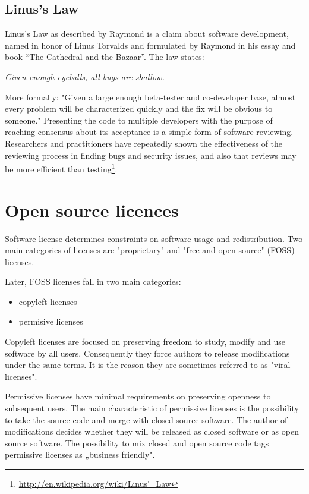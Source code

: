 \documentclass[times, utf8, seminar]{fit}
\begin{document}
\subsection{Linus's Law}

Linus's Law as described by Raymond is a claim about software development, named in honor of Linus Torvalds and formulated by Raymond in his essay and book ``The Cathedral and the Bazaar''\citep{bazaar}. The law states:

\begin{center}
\emph{\large{Given enough eyeballs, all bugs are shallow.}}
\end{center}

More formally: "Given a large enough beta-tester and co-developer base, almost every problem will be characterized quickly and the fix will be obvious to someone." Presenting the code to multiple developers with the purpose of reaching consensus about its acceptance is a simple form of software reviewing. Researchers and practitioners have repeatedly shown the effectiveness of the reviewing process in finding bugs and security issues, and also that reviews may be more efficient than testing\footnote{\url{http://en.wikipedia.org/wiki/Linus'\_Law}}.

\section{Open source licences}

Software license determines constraints on software usage and redistribution. Two main categories of licenses are "proprietary" and "free and open source" (FOSS) licenses.

Later, FOSS licenses fall in two main categories:
\begin{itemize}
  \item copyleft licenses
  \item permisive licenses 
\end{itemize} 

Copyleft licenses are focused on preserving freedom to study, modify and use software by all users. Consequently they force authors to release modifications under the same terms. It is the reason they are sometimes referred to as "viral licenses".

Permissive licenses have minimal requirements on preserving openness to subsequent users. The main characteristic of permissive licenses is the possibility to take the source code and merge with closed source software. The author of modifications decides whether they will be released as closed software or as open source software. The possibility to mix closed and open source code tags permissive licenses as „business friendly".
\end{document}
